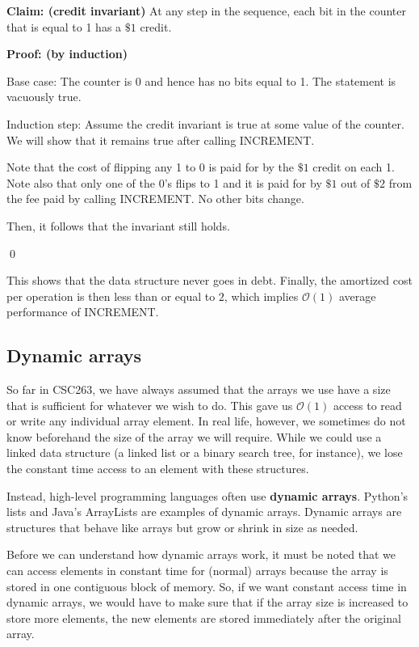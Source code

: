 \documentclass[11pt]{article}
\begin{document}
\textbf{Claim: (credit invariant)} At any step in the sequence, each bit in the counter that is equal to 1 has a $\$ 1$ credit.

\textbf{Proof: (by induction)}

Base case: The counter is 0 and hence has no bits equal to 1. The statement is vacuously true. 

Induction step: Assume the credit invariant is true at some value of the counter. We will show that it remains true after calling INCREMENT. 

Note that the cost of flipping any 1 to 0 is paid for by the $\$1$ credit on each 1. Note also that only one of the 0's flips to 1 and it is paid for by $\$1$ out of $\$2$ from the fee paid by calling INCREMENT. No other bits change. 

Then, it follows that the invariant still holds. 

\qed

This shows that the data structure never goes in debt. Finally, the amortized cost per operation is then less than or equal to $2$, which implies $\mathcal{O}(1)$ average performance of INCREMENT. 

\subsection{Dynamic arrays}
So far in CSC263, we have always assumed that the arrays we use have a size that is sufficient for whatever we wish to do. This gave us $\mathcal{O}(1)$ access to read or write any individual array element. In real life, however, we sometimes do not know beforehand the size of the array we will require. While we could use a linked data structure (a linked list or a binary search tree, for instance), we lose the constant time access to an element with these structures. 

Instead, high-level programming languages often use \textbf{dynamic arrays}. Python's lists and Java's ArrayLists are examples of dynamic arrays. Dynamic arrays are structures that behave like arrays but grow or shrink in size as needed. 

Before we can understand how dynamic arrays work, it must be noted that we can access elements in constant time for (normal) arrays because the array is stored in one contiguous block of memory. So, if we want constant access time in dynamic arrays, we would have to make sure that if the array size is increased to store more elements, the new elements are stored immediately after the original array. 
\end{document}
